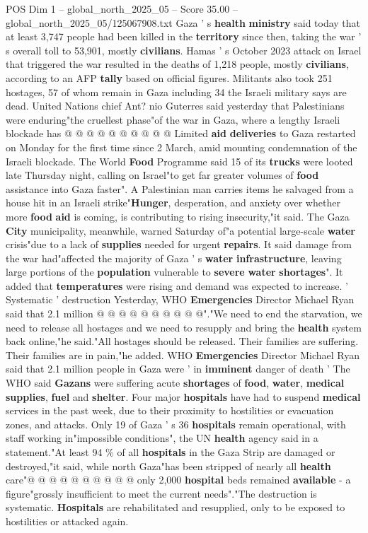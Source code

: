 \begin{textsample}{POS Dim 1 – global\_north\_2025\_05 – Score 35.00 – global\_north\_2025\_05/125067908.txt}
Gaza ' s \textbf{health} \textbf{ministry} said today that at least 3,747 people had been killed in the \textbf{territory} since then, taking the war ' s overall toll to 53,901, mostly \textbf{civilians}.
Hamas ' s October 2023 attack on Israel that triggered the war resulted in the deaths of 1,218 people, mostly \textbf{civilians}, according to an AFP \textbf{tally} based on official figures.
Militants also took 251 hostages, 57 of whom remain in Gaza including 34 the Israeli military says are dead.
United Nations chief Ant? nio Guterres said yesterday that Palestinians were enduring"the cruellest phase"of the war in Gaza, where a lengthy Israeli blockade has @ @ @ @ @ @ @ @ @ @ Limited \textbf{aid} \textbf{deliveries} to Gaza restarted on Monday for the first time since 2 March, amid mounting condemnation of the Israeli blockade.
The World \textbf{Food} Programme said 15 of its \textbf{trucks} were looted late Thursday night, calling on Israel"to get far greater volumes of \textbf{food} assistance into Gaza faster".
A Palestinian man carries items he salvaged from a house hit in an Israeli strike"\textbf{Hunger}, desperation, and anxiety over whether more \textbf{food} \textbf{aid} is coming, is contributing to rising insecurity,"it said.
The Gaza \textbf{City} municipality, meanwhile, warned Saturday of"a potential large-scale \textbf{water} crisis"due to a lack of \textbf{supplies} needed for urgent \textbf{repairs}.
It said damage from the war had"affected the majority of Gaza ' s \textbf{water} \textbf{infrastructure}, leaving large portions of the \textbf{population} vulnerable to \textbf{severe} \textbf{water} \textbf{shortages}".
It added that \textbf{temperatures} were rising and demand was expected to increase. ' Systematic ' destruction Yesterday, WHO \textbf{Emergencies} Director Michael Ryan said that 2.1 million @ @ @ @ @ @ @ @ @ @"."We need to end the starvation, we need to release all hostages and we need to resupply and bring the \textbf{health} system back online,"he said."All hostages should be released.
Their families are suffering.
Their families are in pain,"he added.
WHO \textbf{Emergencies} Director Michael Ryan said that 2.1 million people in Gaza were ' in \textbf{imminent} danger of death ' The WHO said \textbf{Gazans} were suffering acute \textbf{shortages} of \textbf{food}, \textbf{water}, \textbf{medical} \textbf{supplies}, \textbf{fuel} and \textbf{shelter}.
Four major \textbf{hospitals} have had to suspend \textbf{medical} services in the past week, due to their proximity to hostilities or evacuation zones, and attacks.
Only 19 of Gaza ' s 36 \textbf{hospitals} remain operational, with staff working in"impossible conditions", the UN \textbf{health} agency said in a statement."At least 94 \% of all \textbf{hospitals} in the Gaza Strip are damaged or destroyed,"it said, while north Gaza"has been stripped of nearly all \textbf{health} care"@ @ @ @ @ @ @ @ @ @ only 2,000 \textbf{hospital} beds remained \textbf{available} - a figure"grossly insufficient to meet the current needs"."The destruction is systematic. \textbf{Hospitals} are rehabilitated and resupplied, only to be exposed to hostilities or attacked again.

\end{textsample}
